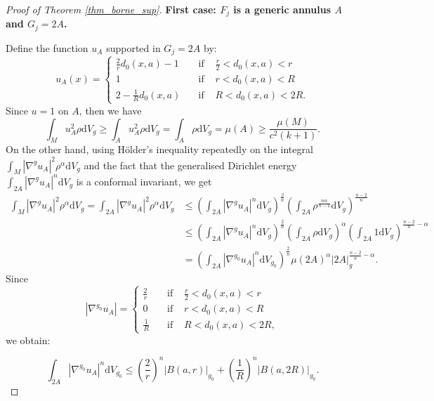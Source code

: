 \documentclass[12pt,reqno]{amsart}		%
\theoremstyle{plain}
\theoremstyle{definition}
\theoremstyle{remark}
\numberwithin{equation}{section}
\renewcommand{\textbf}[1]{\begingroup\bfseries\mathversion{bold}#1\endgroup} %
\renewcommand{\d}{\mathrm{d}}
\begin{document}
\begin{proof}[Proof of Theorem \ref{thm_borne_sup}]
\medskip
	\textbf{First case:}
	$F_{j}$ is a generic annulus $A$ and $G_j = 2A$.
	\begin{center}
		\def\svgscale{0.8}
		
	\end{center}
	Define the function $u_{A}$ supported in $G_{j}=2A$ by:
	\[
	u_{A}(x) = \left\{
	\begin{array}{lll}
	\frac{2}{r}d_{0}(x,a)-1\quad&\mbox{if }& \frac{r}{2}<d_{0}(x,a)<r \\
	1\quad&\mbox{if }& r<d_{0}(x,a)<R\\
	2-\frac{1}{R}d_{0}(x,a)\quad&\mbox{if }& R<d_{0}(x,a)<2R.
	\end{array}
	\right.
	\]
	Since $u=1$ on $A$, then we have 
	\begin{equation}
	\label{luc10}
\int_{M}u_{A}^{2}\rho \d V_{g}\geqslant \int_{A}u_{A}^{2}\rho \d V_{g}= \int_{A}\rho \d V_{g}=\mu(A)\geqslant \frac{\mu(M)}{c^{2}(k+1)}.
\end{equation}
On the other hand, using Hölder's inequality repeatedly on the integral $\int_{M}|\nabla^{g} u_{A}|^{2}\rho^{\alpha}\d V_{g}$ and the fact that the generalised Dirichlet energy $\int_{2A}|\nabla^{g} u_{A}|^{n}\d V_{g}$ is a conformal invariant, we get
	\begin{align*}
\int_{M}|\nabla^{g} u_{A}|^{2}\rho^{\alpha}\d V_{g}=\int_{2A}|\nabla^{g} u_{A}|^{2}\rho^{\alpha}\d V_{g}
	&\leqslant \left(\int_{2A}|\nabla^{g} u_{A}|^{n}\d V_{g}\right)^{\frac{2}{n}}\left(\int_{2A}\rho^{\frac{n\alpha}{n-2}}\d V_{g}\right)^{\frac{n-2}{n}} \\
	&\leqslant \left(\int_{2A}|\nabla^{g} u_{A}|^{n}\d V_{g}\right)^{\frac{2}{n}} \left(\int_{2A}\rho \d V_{g}\right)^{\alpha}\left(\int_{2A}1\d V_{g}\right)^{\frac{n-2}{n}-\alpha}\\
	&= \left(\int_{2A}|\nabla^{g_{0}} u_{A}|^{n} \d V_{g_{0}}\right)^{\frac{2}{n}} \mu(2A)^{\alpha}|2A|_{g}^{\frac{n-2}{n}-\alpha}.
	\end{align*}
	Since 
	\[
	|\nabla^{g_{0}}u_{A}| = \left\{
	\begin{array}{lll}
	\frac{2}{r}\quad&\mbox{if }& \frac{r}{2}<d_{0}(x,a)<r \\
	0\quad&\mbox{if }& r<d_{0}(x,a)<R\\
	\frac{1}{R}\quad&\mbox{if }& R<d_{0}(x,a)<2R,
	\end{array}
	\right.
	\] 
we obtain:

\begin{equation}
\label{ineg_volume_boules}
\int_{2A}|\nabla^{g_{0}} u_{A}|^{n}\d V_{g_{0}}
\leqslant \left(\frac{2}{r}\right)^{n}|B(a,r)|_{g_{0}}+\left(\frac{1}{R}\right)^{n}\left|B(a,2R)\right|_{g_{0}}.
\end{equation}


\end{proof}
\end{document}
